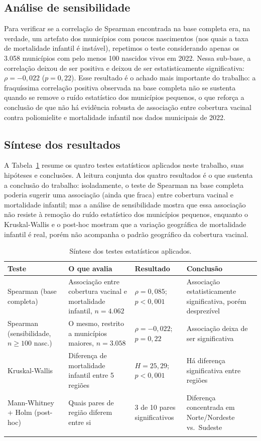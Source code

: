 \documentclass[pdflatex,sn-mathphys-num]{sn-jnl}
\begin{document}
\subsection{Análise de sensibilidade}

Para verificar se a correlação de Spearman encontrada na base completa era, na verdade, um artefato dos municípios com poucos nascimentos (nos quais a taxa de mortalidade infantil é instável), repetimos o teste considerando apenas os 3.058 municípios com pelo menos 100 nascidos vivos em 2022. Nessa sub-base, a correlação deixou de ser positiva e deixou de ser estatisticamente significativa: $\rho = -0{,}022$ ($p = 0{,}22$). Esse resultado é o achado mais importante do trabalho: a fraquíssima correlação positiva observada na base completa não se sustenta quando se remove o ruído estatístico dos municípios pequenos, o que reforça a conclusão de que não há evidência robusta de associação entre cobertura vacinal contra poliomielite e mortalidade infantil nos dados municipais de 2022.

\subsection{Síntese dos resultados}

A Tabela~\ref{tab:sintese} resume os quatro testes estatísticos aplicados neste trabalho, suas hipóteses e conclusões. A leitura conjunta dos quatro resultados é o que sustenta a conclusão do trabalho: isoladamente, o teste de Spearman na base completa poderia sugerir uma associação (ainda que fraca) entre cobertura vacinal e mortalidade infantil; mas a análise de sensibilidade mostra que essa associação não resiste à remoção do ruído estatístico dos municípios pequenos, enquanto o Kruskal-Wallis e o post-hoc mostram que a variação geográfica de mortalidade infantil é real, porém não acompanha o padrão geográfico da cobertura vacinal.

\begin{table}[h]
\centering
\caption{Síntese dos testes estatísticos aplicados.}\label{tab:sintese}
\begin{tabular}{@{}p{3.1cm}p{4.6cm}p{2.3cm}p{3cm}@{}}
\toprule
Teste & O que avalia & Resultado & Conclusão \\
\midrule
Spearman (base completa) & Associação entre cobertura vacinal e mortalidade infantil, $n=4.062$ & $\rho=0{,}085$; $p<0{,}001$ & Associação estatisticamente significativa, porém desprezível \\
Spearman (sensibilidade, $n \geq 100$ nasc.) & O mesmo, restrito a municípios maiores, $n=3.058$ & $\rho=-0{,}022$; $p=0{,}22$ & Associação deixa de ser significativa \\
Kruskal-Wallis & Diferença de mortalidade infantil entre 5 regiões & $H=25{,}29$; $p<0{,}001$ & Há diferença significativa entre regiões \\
Mann-Whitney + Holm (post-hoc) & Quais pares de região diferem entre si & 3 de 10 pares significativos & Diferença concentrada em Norte/Nordeste vs.\ Sudeste \\
\botrule
\end{tabular}
\end{table}
\end{document}
